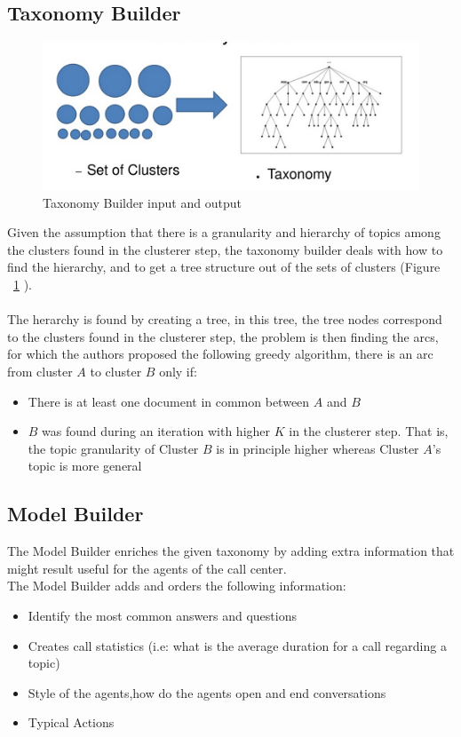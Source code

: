 \documentclass[4pt,a4paper,twocolumn]{article}
\begin{document}
\subsection{Taxonomy Builder}

\begin{figure}[]
  \centering
    \includegraphics[scale=0.2]{pics/taxonomyBuilder.jpg}
    \caption{Taxonomy Builder input and output}
   \label{fig:taxonomyBuilder}  
\end{figure}

Given the assumption that there is a granularity and hierarchy of topics among the clusters found in the clusterer step, the taxonomy builder deals with  how to find the hierarchy, and to get a tree structure out of the sets of clusters (Figure ~\ref{fig:taxonomyBuilder} ).\\
\\
The herarchy is found by creating a tree, in this tree, the tree nodes correspond to the clusters found in the clusterer step, the problem is then finding the arcs, for which the authors proposed the following greedy algorithm, there is an arc from cluster $A$ to cluster $B$ only if:
\begin{itemize}
	\item  There is at least one document in common between $A$ and $B$
	\item  $B$ was found during an iteration with higher $K$ in the clusterer step. That is, the topic granularity of Cluster $B$ is in principle higher whereas Cluster $A$'s topic is more general
\end{itemize}


\subsection{Model Builder}
The Model Builder enriches the given taxonomy by adding extra information that might result useful for the 
agents of the call center.\\
The Model Builder adds and orders the following information:
\begin{itemize}
	\item Identify the most common answers and questions
	\item Creates call statistics (i.e: what is the average duration for a call regarding a topic)
	\item Style of the agents,how do the agents open and end conversations
	\item Typical Actions
\end{itemize}
\end{document}
